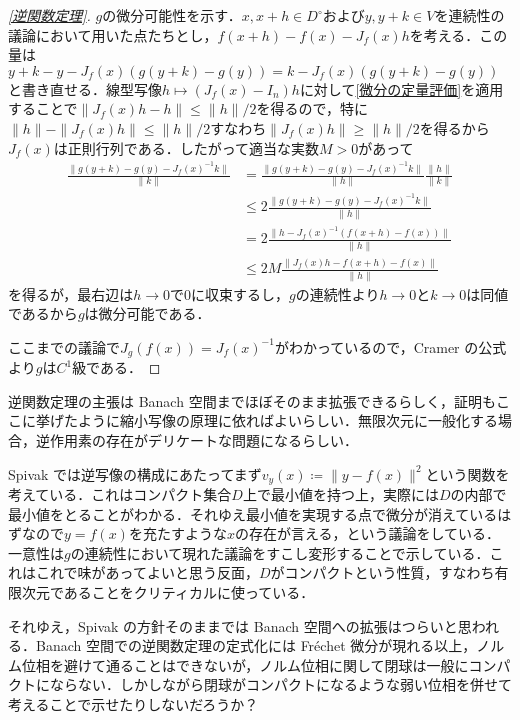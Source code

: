 \begin{proof}[\cref{逆関数定理}]
$g$の微分可能性を示す．$x, x+h \in D^\circ$および$y,y+k \in V$を連続性の議論において用いた点たちとし，$f(x+h) - f(x) - J_f(x)h$を考える．この量は$y+k - y - J_f(x)(g(y+k) - g(y)) = k - J_f(x)(g(y+k)-g(y))$と書き直せる．線型写像$h \mapsto (J_f(x) - I_n)h$に対して\cref{微分の定量評価}を適用することで$\|J_f(x)h - h\| \leq \|h\|/2$を得るので，特に$\|h\| - \|J_f(x)h\| \leq \|h\|/2$すなわち$\|J_f(x)h\| \geq \|h\|/2$を得るから$J_f(x)$は正則行列である．したがって適当な実数$M > 0$があって
\begin{align}
\frac{\|g(y+k)-g(y) - {J_f(x)}^{-1}k \|}{\|k\|} &= \frac{\|g(y+k)-g(y) - {J_f(x)}^{-1}k \|}{\|h\|}\frac{\|h\|}{\|k\|}\\
&\leq 2\frac{\|g(y+k)-g(y) - {J_f(x)}^{-1}k \|}{\|h\|}\\
&= 2\frac{\|h - {J_f(x)}^{-1}(f(x+h)-f(x)) \|}{\|h\|}\\
&\leq 2M\frac{\|J_f(x)h - f(x+h)-f(x) \|}{\|h\|}
\end{align}を得るが，最右辺は$h \to 0$で0に収束するし，$g$の連続性より$h \to 0$と$k \to 0$は同値であるから$g$は微分可能である．

ここまでの議論で$J_g(f(x)) = {J_f(x)}^{-1}$がわかっているので，Cramer の公式より$g$は$C^1$級である．
\end{proof}

\begin{que}[**]
逆関数定理の主張は Banach 空間までほぼそのまま拡張できるらしく，証明もここに挙げたように縮小写像の原理に依ればよいらしい．無限次元に一般化する場合，逆作用素の存在がデリケートな問題になるらしい．
\end{que}

\begin{que}
Spivak では逆写像の構成にあたってまず$v_y(x) \coloneqq \|y-f(x)\|^2$という関数を考えている．これはコンパクト集合$D$上で最小値を持つ上，実際には$D$の内部で最小値をとることがわかる．それゆえ最小値を実現する点で微分が消えているはずなので$y=f(x)$を充たすような$x$の存在が言える，という議論をしている．一意性は$g$の連続性において現れた議論をすこし変形することで示している．これはこれで味があってよいと思う反面，$D$がコンパクトという性質，すなわち有限次元であることをクリティカルに使っている．
\end{que}

\begin{que}[**]
それゆえ，Spivak の方針そのままでは Banach 空間への拡張はつらいと思われる．Banach 空間での逆関数定理の定式化には Fr\'echet 微分が現れる以上，ノルム位相を避けて通ることはできないが，ノルム位相に関して閉球は一般にコンパクトにならない．しかしながら閉球がコンパクトになるような弱い位相を併せて考えることで示せたりしないだろうか？
\end{que}

